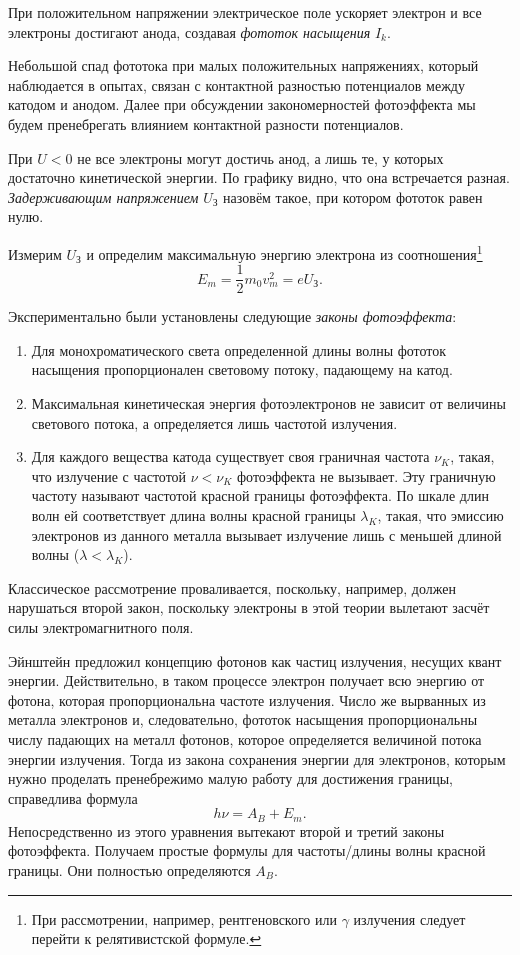 При положительном напряжении электрическое поле ускоряет электрон и все
электроны достигают анода, создавая \emph{фототок насыщения} $ I_k $.

Небольшой спад фототока при малых положительных 
напряжениях, который наблюдается в опытах, связан с контактной 
разностью потенциалов между катодом и анодом. Далее при 
обсуждении закономерностей фотоэффекта мы будем пренебрегать
влиянием контактной разности потенциалов.

При $ U < 0 $ не все электроны могут достичь анод, а лишь те, у которых
достаточно кинетической энергии. По графику видно, что она встречается разная.
\emph{Задерживающим напряжением} $ U_{\text{З}} $ назовём такое, при котором
фототок равен нулю.

Измерим $ U_{\text{З}} $ и определим максимальную энергию электрона из
соотношения\footnote{При рассмотрении, например, рентгеновского или $ \gamma $
излучения следует перейти к релятивистской формуле.} 
\[
  E_m = \frac{1}{2}m_0 v_m^2 = eU_{\text{З}}.
\]

Экспериментально были установлены следующие \emph{законы фотоэффекта}:
\begin{enumerate}
  \item Для монохроматического света определенной длины волны
фототок насыщения пропорционален световому потоку, 
падающему на катод.
\item Максимальная кинетическая энергия фотоэлектронов не 
зависит от величины светового потока, а определяется лишь 
частотой излучения.
\item Для каждого вещества катода существует своя граничная
частота $ \nu_K $, такая, что излучение с частотой $ \nu < \nu_K $ фотоэффекта
не вызывает. Эту граничную частоту называют частотой красной
границы фотоэффекта. По шкале длин волн ей соответствует 
длина волны красной границы $ \lambda_K $, такая, что эмиссию электронов из
данного металла вызывает излучение лишь с меньшей длиной
волны ($ \lambda < \lambda_K $).
\end{enumerate}

Классическое рассмотрение проваливается, поскольку, например, должен нарушаться
второй закон, поскольку электроны в этой теории вылетают засчёт силы
электромагнитного поля.

Эйнштейн предложил концепцию фотонов как частиц
излучения, несущих квант энергии. Действительно, в таком
процессе электрон получает всю энергию от фотона, которая 
пропорциональна частоте излучения. Число же вырванных из металла
электронов и, следовательно, фототок насыщения пропорциональны числу падающих на
металл фотонов, которое определяется
величиной потока энергии излучения. Тогда из закона сохранения энергии для
электронов, которым нужно проделать пренебрежимо малую работу для достижения
границы, справедлива формула  
\[
    h\nu = A_B + E_m.
\]
Непосредственно из этого уравнения вытекают второй и третий законы фотоэффекта.
Получаем простые формулы для частоты/длины волны красной границы. Они полностью
определяются $ A_B $.


